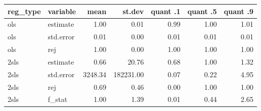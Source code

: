 \begin{tabular}{llrrrrr}
  \hline
reg\_type & variable & mean & st.dev & quant .1 & quant .5 & quant .9 \\ 
  \hline
ols & estimate & 1.00 & 0.01 & 0.99 & 1.00 & 1.01 \\ 
  ols & std.error & 0.01 & 0.00 & 0.01 & 0.01 & 0.01 \\ 
  ols & rej & 1.00 & 0.00 & 1.00 & 1.00 & 1.00 \\ 
  2sls & estimate & 0.66 & 20.76 & 0.68 & 1.00 & 1.32 \\ 
  2sls & std.error & 3248.34 & 182231.00 & 0.07 & 0.22 & 4.95 \\ 
  2sls & rej & 0.69 & 0.46 & 0.00 & 1.00 & 1.00 \\ 
  2sls & f\_stat & 1.00 & 1.39 & 0.01 & 0.44 & 2.65 \\ 
   \hline
\end{tabular}
